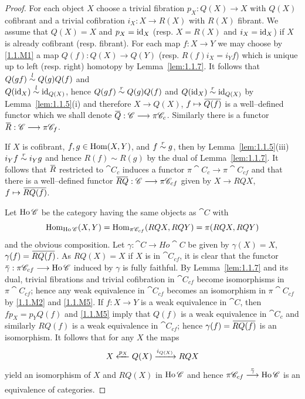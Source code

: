 \documentclass[../main]{subfiles}
\begin{document}
\begin{proof}
For each object $X$ choose a trivial fibration $p_X : Q(X) \longrightarrow X$ with $Q(X)$ cofibrant and a trivial cofibration $i_X : X \longrightarrow R(X)$ with $R(X)$ fibrant. We assume that $Q(X) = X$ and $p_X = \operatorname{id}_X$ (resp. $X = R(X)$ and $i_X = \operatorname{id}_X$) if $X$ is already cofibrant (resp. fibrant). For each map $f : X \longrightarrow Y$ we may choose by \ref{1.1.M1} a map $Q(f) : Q(X) \longrightarrow Q(Y)$ (resp. $R(f) i_X = i_Y f$) which is unique up to left (resp. right) homotopy by Lemma~\ref{lem:1.1.7}. It follows that $Q(gf) \overset{l}{\sim} Q(g) Q(f)$ and \\ $Q(\operatorname{id}_X) \overset{l}{\sim} \operatorname{id}_{Q(X)}$, hence $Q(gf) \overset{r}{\sim} Q(g) Q(f)$ and $Q(\operatorname{id}_X) \overset{r}{\sim} \operatorname{id}_{Q(X)}$ by Lemma~\ref{lem:1.1.5}(i) and therefore $X \longrightarrow Q(X)$, $f \mapsto \xoverline {Q(f)}$ is a well--defined functor which we shall denote $\xoverline Q : \cat C \longrightarrow \pi \cat C_c$. Similarly there is a functor $\xoverline R : \cat C \longrightarrow \pi \cat C_f$.

If $X$ is cofibrant, $f, g \in \operatorname{Hom}(X, Y)$, and $f \overset{r}{\sim} g$, then by Lemma~\ref{lem:1.1.5}(iii) $i_Y f \overset{r}{\sim} i_Y g$ and hence $R(f) \sim R(g)$ by the dual of Lemma~\ref{lem:1.1.7}. It follows that $\xoverline R$ restricted to $\cat C_c$ induces a functor $\pi \cat C_c \longrightarrow \pi \cat C_{cf}$ and that there is a well--defined functor $\xoverline {RQ} : \cat C \longrightarrow \pi \cat C_{cf}$ given by $X \longrightarrow RQX$, $f \mapsto \xoverline {RQ(f)}$.

Let $\operatorname{Ho} \mathscr{C}$ be the category having the same objects as $\cat C$ with \[\operatorname{Hom}_{\operatorname{Ho} \mathscr{C}}(X, Y) = \operatorname{Hom}_{\pi \mathscr{C}_{cf}}(RQX, RQY) = \pi(RQX, RQY)\]
and the obvious composition. Let $\gamma : \cat C \longrightarrow Ho \cat C$ be given by $\gamma(X) = X$, $\gamma(f) = \xoverline {RQ(f)}$. As $RQ(X) = X$ if $X$ is in $\cat C_{cf}$, it is clear that the functor $\xoverline \gamma : \pi \cat C_{cf} \longrightarrow \Ho \cat C$ induced by $\gamma$ is fully faithful. By Lemma~\ref{lem:1.1.7} and its dual, trivial fibrations and trivial cofibration in $\cat C_{cf}$ become isomorphisms in $\pi \cat C_{cf}$; hence any weak equivalence in $\cat C_{cf}$ becomes an isomorphism in $\pi \cat C_{cf}$ by \ref{1.1.M2} and \ref{1.1.M5}. If $f : X \longrightarrow Y$ is a weak equivalence in $\cat C$, then $f p_X = p_Y Q(f)$ and \ref{1.1.M5} imply that $Q(f)$ is a weak equivalence in $\cat C_c$ and similarly $RQ(f)$ is a weak equivalence in $\cat C_{cf}$; hence $\gamma(f) = \xoverline {RQ(f)}$ is an isomorphism. It follows that for any $X$ the maps \[X \xleftarrow{p_X} Q(X) \varrightarrow{i_{Q(X)}} RQX\] yield an isomorphism of $X$ and $RQ(X)$ in $\operatorname{Ho} \mathscr{C}$ and hence $\pi \cat C_{cf} \varrightarrow{\xoverline \gamma} \Ho \cat C$ is an equivalence of categories. 


\end{proof}
\end{document}
